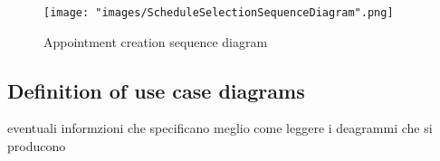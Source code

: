 \begin{figure}[H]
\begin{center}
\texttt{[image: "images/ScheduleSelectionSequenceDiagram".png]}
\caption{Appointment creation sequence diagram}
\label{img:ScheduleSelection}
\end{center}
\end{figure}

\subsection{Definition of use case diagrams}
eventuali informzioni che specificano meglio come leggere i deagrammi che si producono



